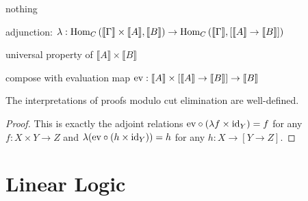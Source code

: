 \documentclass[12pt]{article}
\newcommand{\br}[1]{\llbracket #1 \rrbracket}
\begin{document}
\begin{defn}
\begin{center}
\begin{minipage}{0.45\textwidth}
\begin{prooftree}
\end{prooftree}
\begin{center}
nothing
\end{center}
\begin{prooftree}
\end{prooftree}
\begin{center}
adjunction: $\lambda : \Hom{C}{\br{\Gamma} \times \br{A}}{\br{B}} \to \Hom{C}{\br{\Gamma}}{[\br{A} \to \br{B}]}$
\end{center}
\end{minipage}
\begin{minipage}{0.45\textwidth}
\begin{prooftree}
\end{prooftree}
\begin{center}
universal property of $\br{A} \times \br{B}$
\end{center}
\begin{prooftree}
\end{prooftree}
\begin{center}
compose with evaluation map $\ev : \br{A} \times [\br{A} \to \br{B}] \to \br{B}$
\end{center}
\end{minipage}
\end{center}
\end{defn}

\begin{theorem}
The interpretations of proofs modulo cut elimination are well-defined. 
\end{theorem}

\begin{proof}
This is exactly the adjoint relations $\ev \circ (\lambda f \times \id_Y) = f$ for any $f : X \times Y \to Z$ and $\lambda(\ev \circ (h \times \id_Y)) = h$ for any $h : X \to [Y \to Z]$.
\end{proof}

\section{Linear Logic}
\end{document}
